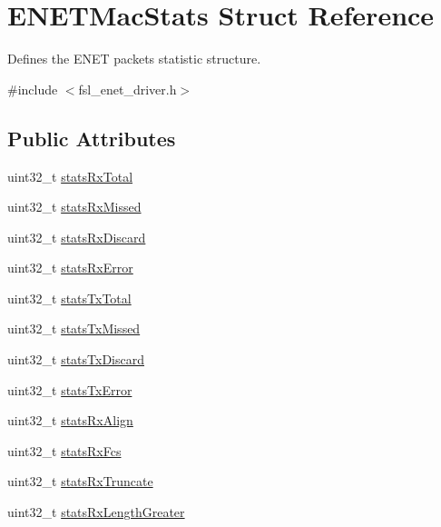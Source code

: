 \hypertarget{structENETMacStats}{}\section{E\+N\+E\+T\+Mac\+Stats Struct Reference}
\label{structENETMacStats}


Defines the E\+N\+ET packets statistic structure.  




{\ttfamily \#include $<$fsl\+\_\+enet\+\_\+driver.\+h$>$}

\subsection*{Public Attributes}
\begin{DoxyCompactItemize}
\item 
uint32\+\_\+t \hyperlink{structENETMacStats_ae85b2e4a6f12e5a72ce7e4eedbfd69cf}{stats\+Rx\+Total}
\item 
uint32\+\_\+t \hyperlink{structENETMacStats_a4dc0edd0e2da923b713c5a78a8e70197}{stats\+Rx\+Missed}
\item 
uint32\+\_\+t \hyperlink{structENETMacStats_a46e5eaaf59970224efa0c39d1903c170}{stats\+Rx\+Discard}
\item 
uint32\+\_\+t \hyperlink{structENETMacStats_a5370e5296c698c42aec1bec778f916a0}{stats\+Rx\+Error}
\item 
uint32\+\_\+t \hyperlink{structENETMacStats_a5d31ececa2ce384342c824605d43b53e}{stats\+Tx\+Total}
\item 
uint32\+\_\+t \hyperlink{structENETMacStats_ac27b873594607415fd1228f328014006}{stats\+Tx\+Missed}
\item 
uint32\+\_\+t \hyperlink{structENETMacStats_a2d116373873ebaa5aafa16f13fc7f98e}{stats\+Tx\+Discard}
\item 
uint32\+\_\+t \hyperlink{structENETMacStats_a2f97920ade8de4608460e7fc1e883833}{stats\+Tx\+Error}
\item 
uint32\+\_\+t \hyperlink{structENETMacStats_ac66ba521e708361cdd249a2e55589fc0}{stats\+Rx\+Align}
\item 
uint32\+\_\+t \hyperlink{structENETMacStats_a9773e2ef3f8ec1c6fc6dd9985cc5f841}{stats\+Rx\+Fcs}
\item 
uint32\+\_\+t \hyperlink{structENETMacStats_af473e00e212f117337781ac88cdc067a}{stats\+Rx\+Truncate}
\item 
uint32\+\_\+t \hyperlink{structENETMacStats_a4ce7bf7e3f50a2d07134fb9436f86106}{stats\+Rx\+Length\+Greater}

\end{DoxyCompactItemize}
